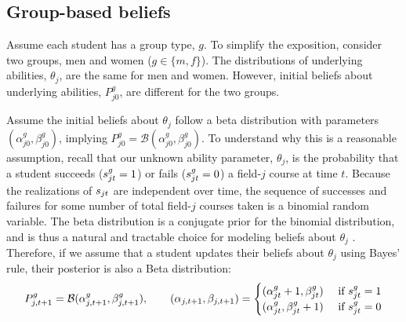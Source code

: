 \subsection{Group-based beliefs}\label{sec:group_based_beliefs}

Assume each student has a group type, $g$. 
To simplify the exposition, consider two groups, men and women ($g \in \{m, f\}$).
The distributions of underlying abilities, $\theta_j$, are the same for men and women.
However, initial beliefs about underlying abilities, $P_{j0}^g$, are different for the two groups.

Assume the initial beliefs about $\theta_j$ follow a beta distribution with parameters $(\alpha_{j0}^g, \beta_{j0}^g)$, implying $P_{j0}^g = \mathcal{B} (\alpha_{j0}^g, \beta_{j0}^g)$.
To understand why this is a reasonable assumption, recall that our unknown ability parameter, $\theta_j$, is the probability that a student succeeds ($s_{jt}^g = 1$) or fails ($s_{jt}^g = 0$) a field-$j$ course at time $t$.
Because the realizations of $s_{jt}$ are independent over time, the sequence of successes and failures for some number of total field-$j$ courses taken is a binomial random variable.
The beta distribution is a conjugate prior for the binomial distribution, and is thus a natural and tractable choice for modeling beliefs about $\theta_j$ \parencite[pg. 325]{CB02}.
Therefore, if we assume that a student updates their beliefs about $\theta_j$ using Bayes' rule, their posterior is also a Beta distribution: 
\begin{equation}\label{eq:beta_updating}
    P_{j,t+1}^g = \mathcal{B} (\alpha_{j,t+1}^g, \beta_{j,t+1}^g), \quad \quad 
    (\alpha_{j,t+1}, \beta_{j,t+1}) = 
    \begin{cases} 
        (\alpha_{jt}^g + 1, \beta_{jt}^g) &\text{ if } s_{jt}^g = 1 \\
        (\alpha_{jt}^g, \beta_{jt}^g + 1) &\text{ if } s_{jt}^g = 0
    \end{cases}
\end{equation}


